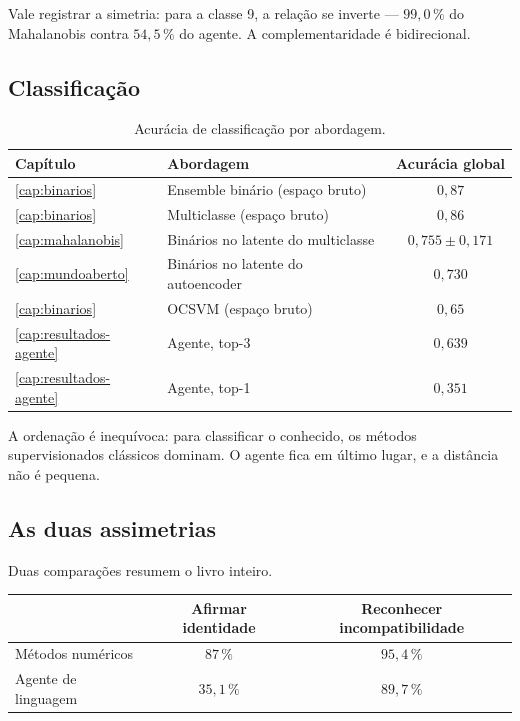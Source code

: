 Vale registrar a simetria: para a classe 9, a relação se inverte --- $99{,}0\,\%$ do
Mahalanobis contra $54{,}5\,\%$ do agente. A complementaridade é bidirecional.

\subsection{Classificação}

\begin{table}[htbp]
\centering
\caption{Acurácia de classificação por abordagem.}
\label{tab:sint-classificacao}
\small
\begin{tabular}{llc}
\toprule
\textbf{Capítulo} & \textbf{Abordagem} & \textbf{Acurácia global} \\
\midrule
\cref{cap:binarios} & Ensemble binário (espaço bruto)      & $0{,}87$ \\
\cref{cap:binarios} & Multiclasse (espaço bruto)           & $0{,}86$ \\
\cref{cap:mahalanobis} & Binários no latente do multiclasse & $0{,}755 \pm 0{,}171$ \\
\cref{cap:mundoaberto} & Binários no latente do autoencoder & $0{,}730$ \\
\cref{cap:binarios} & OCSVM (espaço bruto)                 & $0{,}65$ \\
\cref{cap:resultados-agente} & Agente, top-3               & $0{,}639$ \\
\cref{cap:resultados-agente} & Agente, top-1               & $0{,}351$ \\
\bottomrule
\end{tabular}
\end{table}

A ordenação é inequívoca: para classificar o conhecido, os métodos supervisionados
clássicos dominam. O agente fica em último lugar, e a distância não é pequena.

\subsection{As duas assimetrias}

Duas comparações resumem o livro inteiro.

\begin{center}
\small
\begin{tabular}{lcc}
\toprule
& \textbf{Afirmar identidade} & \textbf{Reconhecer incompatibilidade} \\
\midrule
Métodos numéricos & $87\,\%$   & $95{,}4\,\%$ \\
Agente de linguagem & $35{,}1\,\%$ & $89{,}7\,\%$ \\
\bottomrule
\end{tabular}
\end{center}


